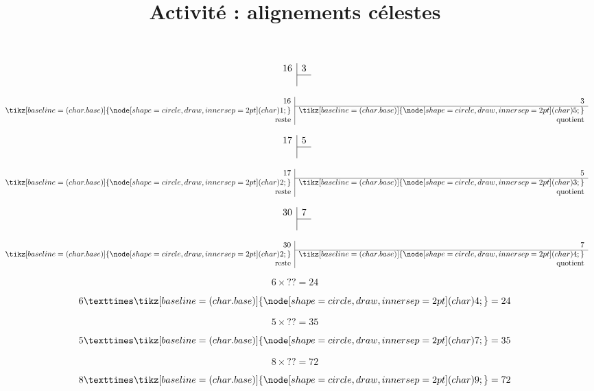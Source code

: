 \documentclass[a4paper]{beamer}
\title{Activité : alignements célestes}
\date{}
\newcommand*\circled[1]{\tikz[baseline=(char.base)]{
            \node[shape=circle,draw,inner sep=2pt] (char) {#1};}}
\begin{document}
\begin{frame}
	$$
		\begin{array}{r|r}
			16 & 3 \\
			\cline{2-2}
			   &
		\end{array}
	$$
\end{frame}

\begin{frame}
	$$
		\begin{array}{r|r}
			16           & 3               \\
			\cline{2-2}
			\circled{1}  & \circled{5}     \\
			\text{reste} & \text{quotient}
		\end{array}
	$$
\end{frame}

\begin{frame}
	$$
		\begin{array}{r|r}
			17 & 5 \\
			\cline{2-2}
			   &
		\end{array}
	$$
\end{frame}

\begin{frame}
	$$
		\begin{array}{r|r}
			17           & 5               \\
			\cline{2-2}
			\circled{2}  & \circled{3}     \\
			\text{reste} & \text{quotient}
		\end{array}
	$$
\end{frame}

\begin{frame}
	$$
		\begin{array}{r|r}
			30 & 7 \\
			\cline{2-2}
			   &
		\end{array}
	$$
\end{frame}

\begin{frame}
	$$
		\begin{array}{r|r}
			30           & 7               \\
			\cline{2-2}
			\circled{2}  & \circled{4}     \\
			\text{reste} & \text{quotient}
		\end{array}
	$$
\end{frame}

\begin{frame}
	$$ 6 × ?? = 24 $$
\end{frame}

\begin{frame}
	$$ 6 × \circled{4} = 24 $$
\end{frame}

\begin{frame}
	$$ 5 × ?? = 35 $$
\end{frame}

\begin{frame}
	$$ 5 ×\circled{7} = 35 $$
\end{frame}

\begin{frame}
	$$ 8 × ?? = 72 $$
\end{frame}

\begin{frame}
	$$ 8 × \circled{9} = 72 $$
\end{frame}
\end{document}
